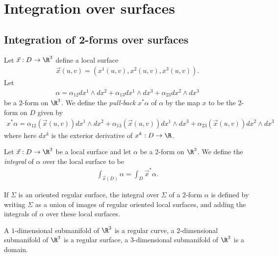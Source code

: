 \documentclass{article}
\begin{document}
\section{Integration over surfaces}

\subsection{Integration of 2-forms over surfaces}

\begin{definition}
    Let $\vec x:D\to\R^3$ define a local surface
    \begin{align*}
        \vec x(u,v)=(x^1(u,v), x^2(u,v), x^3(u,v)).
    \end{align*}
    Let
    \begin{align*}
        \alpha = \alpha_{12}dx^1\wedge dx^2 + \alpha_{13}dx^1\wedge dx^3 + \alpha_{23}dx^2\wedge dx^3
    \end{align*}
    be a $2$-form on $\R^3$. We define the \emph{pull-back} $x^*\alpha$ of $\alpha$ by the map $x$
    to be the $2$-form on $D$ given by
    \begin{align*}
        x^*\alpha = \alpha_{12}(\vec x(u,v))dx^1\wedge dx^2+ \alpha_{13}(\vec x(u,v))dx^1\wedge dx^3 + \alpha_{23}(\vec x(u,v))dx^2\wedge dx^3
    \end{align*}
    where here $dx^k$ is the exterior derivative of $x^k:D\to\R$.
\end{definition}

\begin{definition}
    Let $\vec x:D\to\R^3$ be a local surface and let $\alpha$ be a $2$-form on $\R^3$. We define
    the \emph{integral} of $\alpha$ over the local surface to be
    \begin{align*}
        \int_{\vec x(D)} \alpha = \int_D \vec x^*\alpha.
    \end{align*}
\end{definition}

\begin{definition}
    If $\Sigma$ is an oriented regular surface, the integral over $\Sigma$ of a $2$-form $\alpha$
    is defined by writing $\Sigma$ as a union of images of regular oriented local surfaces, and
    adding the integrals of $\alpha$ over these local surfaces.
\end{definition}

\begin{definition}
    A $1$-dimensional submanifold of $\R^3$ is a regular curve, a $2$-dimensional submanifold of
    $\R^3$ is a regular surface, a $3$-dimensional submanifold of $\R^3$ is a domain.
\end{definition}
\end{document}
